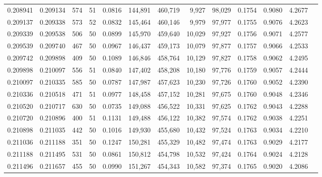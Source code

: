 \begin{tabular}{rrrrrrrrrrrrr}
0.208941 & 0.209134 &   574 &  51 &                                     0.0816 & 144,891 & 460,719 &   9,927 &  98,029 & 0.1754 & 0.9080 & 4.2677 \\
0.209137 & 0.209338 &   573 &  52 &                                     0.0832 & 145,464 & 460,146 &   9,979 &  97,977 & 0.1755 & 0.9076 & 4.2623 \\
0.209339 & 0.209538 &   506 &  50 &                                     0.0899 & 145,970 & 459,640 &  10,029 &  97,927 & 0.1756 & 0.9071 & 4.2577 \\
0.209539 & 0.209740 &   467 &  50 &                                     0.0967 & 146,437 & 459,173 &  10,079 &  97,877 & 0.1757 & 0.9066 & 4.2533 \\
0.209742 & 0.209898 &   409 &  50 &                                     0.1089 & 146,846 & 458,764 &  10,129 &  97,827 & 0.1758 & 0.9062 & 4.2495 \\
0.209898 & 0.210097 &   556 &  51 &                                     0.0840 & 147,402 & 458,208 &  10,180 &  97,776 & 0.1759 & 0.9057 & 4.2444 \\
0.210097 & 0.210335 &   585 &  50 &                                     0.0787 & 147,987 & 457,623 &  10,230 &  97,726 & 0.1760 & 0.9052 & 4.2390 \\
0.210336 & 0.210518 &   471 &  51 &                                     0.0977 & 148,458 & 457,152 &  10,281 &  97,675 & 0.1760 & 0.9048 & 4.2346 \\
0.210520 & 0.210717 &   630 &  50 &                                     0.0735 & 149,088 & 456,522 &  10,331 &  97,625 & 0.1762 & 0.9043 & 4.2288 \\
0.210720 & 0.210896 &   400 &  51 &                                     0.1131 & 149,488 & 456,122 &  10,382 &  97,574 & 0.1762 & 0.9038 & 4.2251 \\
0.210898 & 0.211035 &   442 &  50 &                                     0.1016 & 149,930 & 455,680 &  10,432 &  97,524 & 0.1763 & 0.9034 & 4.2210 \\
0.211036 & 0.211188 &   351 &  50 &                                     0.1247 & 150,281 & 455,329 &  10,482 &  97,474 & 0.1763 & 0.9029 & 4.2177 \\
0.211188 & 0.211495 &   531 &  50 &                                     0.0861 & 150,812 & 454,798 &  10,532 &  97,424 & 0.1764 & 0.9024 & 4.2128 \\
0.211496 & 0.211657 &   455 &  50 &                                     0.0990 & 151,267 & 454,343 &  10,582 &  97,374 & 0.1765 & 0.9020 & 4.2086 \\

\end{tabular}

